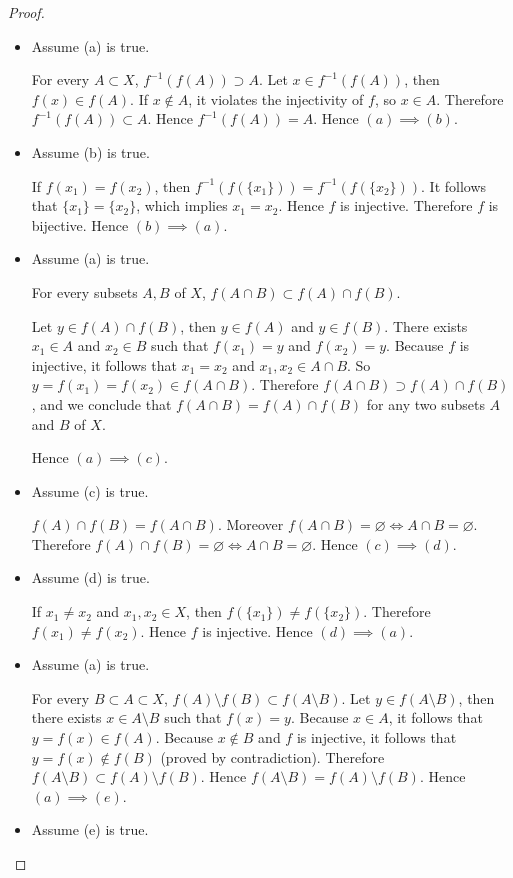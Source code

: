 \begin{proof}
    \begin{itemize}
        \item Assume (a) is true.

              For every $A\subset X$, $f^{-1}(f(A))\supset A$. Let $x\in f^{-1}(f(A))$, then $f(x)\in f(A)$. If $x\notin A$, it violates the injectivity of $f$, so $x\in A$. Therefore $f^{-1}(f(A))\subset A$. Hence $f^{-1}(f(A)) = A$. Hence $(a)\implies (b)$.
        \item Assume (b) is true.

              If $f(x_{1}) = f(x_{2})$, then $f^{-1}(f(\{x_{1}\})) = f^{-1}(f(\{x_{2}\}))$. It follows that $\{ x_{1} \} = \{ x_{2} \}$, which implies $x_{1} = x_{2}$. Hence $f$ is injective. Therefore $f$ is bijective. Hence $(b)\implies (a)$.
        \item Assume (a) is true.

              For every subsets $A, B$ of $X$, $f(A\cap B)\subset f(A)\cap f(B)$.

              Let $y\in f(A)\cap f(B)$, then $y\in f(A)$ and $y\in f(B)$. There exists $x_{1}\in A$ and $x_{2}\in B$ such that $f(x_{1}) = y$ and $f(x_{2}) = y$. Because $f$ is injective, it follows that $x_{1} = x_{2}$ and $x_{1}, x_{2}\in A\cap B$. So $y = f(x_{1}) = f(x_{2})\in f(A\cap B)$. Therefore $f(A\cap B) \supset f(A)\cap f(B)$, and we conclude that $f(A\cap B) = f(A)\cap f(B)$ for any two subsets $A$ and $B$ of $X$.

              Hence $(a)\implies (c)$.
        \item Assume (c) is true.

              $f(A)\cap f(B) = f(A\cap B)$. Moreover $f(A\cap B) = \varnothing \Leftrightarrow A\cap B = \varnothing$. Therefore $f(A)\cap f(B) = \varnothing \Leftrightarrow A\cap B = \varnothing$. Hence $(c)\implies (d)$.
        \item Assume (d) is true.

              If $x_{1}\ne x_{2}$ and $x_{1}, x_{2}\in X$, then $f(\{x_{1}\})\ne f(\{x_{2}\})$. Therefore $f(x_{1})\ne f(x_{2})$. Hence $f$ is injective. Hence $(d)\implies (a)$.
        \item Assume (a) is true.

              For every $B\subset A\subset X$, $f(A)\setminus f(B)\subset f(A\setminus B)$. Let $y\in f(A\setminus B)$, then there exists $x\in A\setminus B$ such that $f(x) = y$. Because $x\in A$, it follows that $y = f(x)\in f(A)$. Because $x\notin B$ and $f$ is injective, it follows that $y = f(x)\notin f(B)$ (proved by contradiction). Therefore $f(A\setminus B)\subset f(A)\setminus f(B)$. Hence $f(A\setminus B) = f(A)\setminus f(B)$. Hence $(a)\implies (e)$.
        \item Assume (e) is true.


\end{itemize}
\end{proof}
